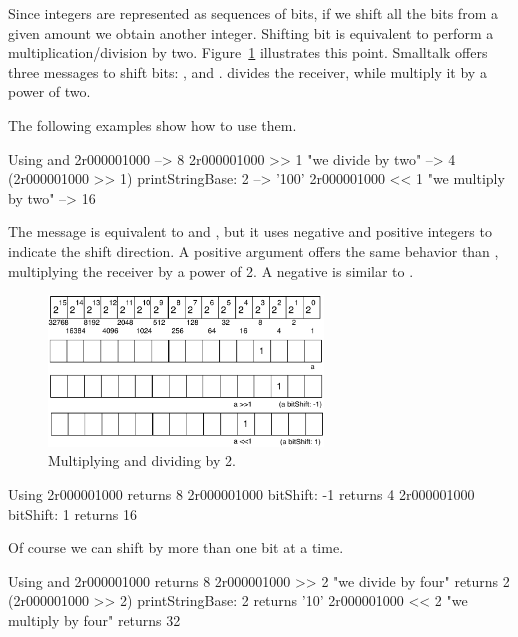 \documentclass[a4paper,10pt,twoside]{book}
\begin{document}
Since integers are represented as sequences of bits, if we shift all the bits from a given amount we obtain another integer. Shifting bit is equivalent to perform a multiplication/division by two. Figure~\ref{bitshiftmult} illustrates this point. Smalltalk offers three messages to shift bits: ,  and . \ct{>>} divides the receiver, while \ct{<<} multiply it by a power of two.

The following examples show how to use them.


\begin{code}{Using \ct{>>} and \ct{<<}}
2r000001000 
	--> 8
2r000001000 >> 1					"we divide by two"
	--> 4
(2r000001000 >> 1) printStringBase: 2 	
	--> '100'
2r000001000 << 1					"we multiply by two"
	--> 16
\end{code}

The message  is equivalent to \ct{>>} and \ct{<<}, but it uses negative and positive integers to indicate the shift direction. A positive argument offers the same behavior than \ct{<<}, multiplying the receiver by a power of 2. A negative is similar to \ct{>>}. 

\begin{figure}[h]
\begin{center}
\includegraphics[width=0.65\textwidth]{16bits-numberMultiplication}
\caption{Multiplying and dividing by 2.\label{bitshiftmult}}
\end{center}
\end{figure}

\begin{code}{Using }
2r000001000 
	returns 8
2r000001000 bitShift: -1
	returns 4
2r000001000 bitShift: 1
	returns 16
\end{code}

Of course we can shift by more than one bit at a time. 

\begin{code}{Using \ct{>>} and \ct{<<}}
2r000001000 
	returns 8
2r000001000 >> 2					"we divide by four"
	returns 2
(2r000001000 >> 2) printStringBase: 2 
	returns '10'	
2r000001000 << 2					"we multiply by four"
	returns 32
\end{code}
\end{document}
